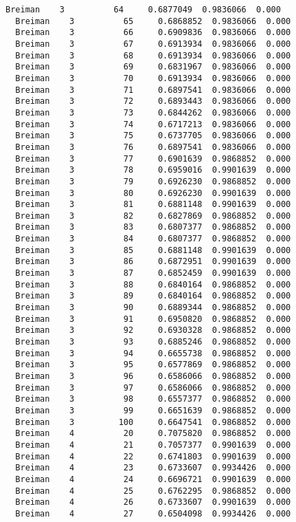 \documentclass[11pt]{article}
\begin{document}
\begin{Verbatim}[commandchars=\\\{\}]
  Breiman    3          64     0.6877049  0.9836066  0.000
  Breiman    3          65     0.6868852  0.9836066  0.000
  Breiman    3          66     0.6909836  0.9836066  0.000
  Breiman    3          67     0.6913934  0.9836066  0.000
  Breiman    3          68     0.6913934  0.9836066  0.000
  Breiman    3          69     0.6831967  0.9836066  0.000
  Breiman    3          70     0.6913934  0.9836066  0.000
  Breiman    3          71     0.6897541  0.9836066  0.000
  Breiman    3          72     0.6893443  0.9836066  0.000
  Breiman    3          73     0.6844262  0.9836066  0.000
  Breiman    3          74     0.6717213  0.9836066  0.000
  Breiman    3          75     0.6737705  0.9836066  0.000
  Breiman    3          76     0.6897541  0.9836066  0.000
  Breiman    3          77     0.6901639  0.9868852  0.000
  Breiman    3          78     0.6959016  0.9901639  0.000
  Breiman    3          79     0.6926230  0.9868852  0.000
  Breiman    3          80     0.6926230  0.9901639  0.000
  Breiman    3          81     0.6881148  0.9901639  0.000
  Breiman    3          82     0.6827869  0.9868852  0.000
  Breiman    3          83     0.6807377  0.9868852  0.000
  Breiman    3          84     0.6807377  0.9868852  0.000
  Breiman    3          85     0.6881148  0.9901639  0.000
  Breiman    3          86     0.6872951  0.9901639  0.000
  Breiman    3          87     0.6852459  0.9901639  0.000
  Breiman    3          88     0.6840164  0.9868852  0.000
  Breiman    3          89     0.6840164  0.9868852  0.000
  Breiman    3          90     0.6889344  0.9868852  0.000
  Breiman    3          91     0.6950820  0.9868852  0.000
  Breiman    3          92     0.6930328  0.9868852  0.000
  Breiman    3          93     0.6885246  0.9868852  0.000
  Breiman    3          94     0.6655738  0.9868852  0.000
  Breiman    3          95     0.6577869  0.9868852  0.000
  Breiman    3          96     0.6586066  0.9868852  0.000
  Breiman    3          97     0.6586066  0.9868852  0.000
  Breiman    3          98     0.6557377  0.9868852  0.000
  Breiman    3          99     0.6651639  0.9868852  0.000
  Breiman    3         100     0.6647541  0.9868852  0.000
  Breiman    4          20     0.7075820  0.9868852  0.000
  Breiman    4          21     0.7057377  0.9901639  0.000
  Breiman    4          22     0.6741803  0.9901639  0.000
  Breiman    4          23     0.6733607  0.9934426  0.000
  Breiman    4          24     0.6696721  0.9901639  0.000
  Breiman    4          25     0.6762295  0.9868852  0.000
  Breiman    4          26     0.6733607  0.9901639  0.000
  Breiman    4          27     0.6504098  0.9934426  0.000

\end{Verbatim}
\end{document}
